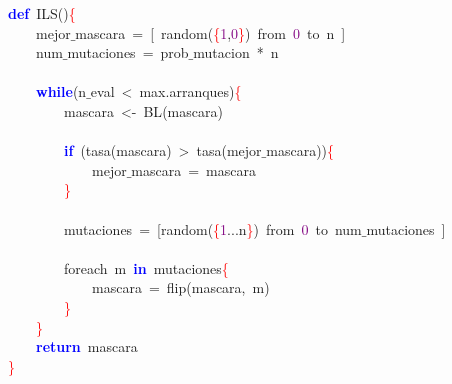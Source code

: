 \noindent
\mbox{}\textbf{\textcolor{Blue}{def}}\ ILS\textcolor{BrickRed}{()}\textcolor{Red}{\{} \\
\mbox{}\ \ \ \ mejor$\_$mascara\ \textcolor{BrickRed}{=}\ \textcolor{BrickRed}{[}\ random\textcolor{BrickRed}{(}\textcolor{Red}{\{}\textcolor{Purple}{1}\textcolor{BrickRed}{,}\textcolor{Purple}{0}\textcolor{Red}{\}}\textcolor{BrickRed}{)}\ from\ \textcolor{Purple}{0}\ to\ n\ \textcolor{BrickRed}{]} \\
\mbox{}\ \ \ \ num$\_$mutaciones\ \textcolor{BrickRed}{=}\ prob$\_$mutacion\ \textcolor{BrickRed}{*}\ n \\
\mbox{} \\
\mbox{}\ \ \ \ \textbf{\textcolor{Blue}{while}}\textcolor{BrickRed}{(}n$\_$eval\ \textcolor{BrickRed}{\textless{}}\ max\textcolor{BrickRed}{.}arranques\textcolor{BrickRed}{)}\textcolor{Red}{\{} \\
\mbox{}\ \ \ \ \ \ \ \ mascara\ \textcolor{BrickRed}{\textless{}-}\ BL\textcolor{BrickRed}{(}mascara\textcolor{BrickRed}{)} \\
\mbox{} \\
\mbox{}\ \ \ \ \ \ \ \ \textbf{\textcolor{Blue}{if}}\ \textcolor{BrickRed}{(}tasa\textcolor{BrickRed}{(}mascara\textcolor{BrickRed}{)}\ \textcolor{BrickRed}{\textgreater{}}\ tasa\textcolor{BrickRed}{(}mejor$\_$mascara\textcolor{BrickRed}{))}\textcolor{Red}{\{} \\
\mbox{}\ \ \ \ \ \ \ \ \ \ \ \ mejor$\_$mascara\ \textcolor{BrickRed}{=}\ mascara \\
\mbox{}\ \ \ \ \ \ \ \ \textcolor{Red}{\}} \\
\mbox{} \\
\mbox{}\ \ \ \ \ \ \ \ mutaciones\ \textcolor{BrickRed}{=}\ \textcolor{BrickRed}{[}random\textcolor{BrickRed}{(}\textcolor{Red}{\{}\textcolor{Purple}{1}\textcolor{BrickRed}{...}n\textcolor{Red}{\}}\textcolor{BrickRed}{)}\ from\ \textcolor{Purple}{0}\ to\ num$\_$mutaciones\ \textcolor{BrickRed}{]} \\
\mbox{} \\
\mbox{}\ \ \ \ \ \ \ \ foreach\ m\ \textbf{\textcolor{Blue}{in}}\ mutaciones\textcolor{Red}{\{} \\
\mbox{}\ \ \ \ \ \ \ \ \ \ \ \ mascara\ \textcolor{BrickRed}{=}\ flip\textcolor{BrickRed}{(}mascara\textcolor{BrickRed}{,}\ m\textcolor{BrickRed}{)} \\
\mbox{}\ \ \ \ \ \ \ \ \textcolor{Red}{\}} \\
\mbox{}\ \ \ \ \textcolor{Red}{\}} \\
\mbox{}\ \ \ \ \textbf{\textcolor{Blue}{return}}\ mascara \\
\mbox{}\textcolor{Red}{\}} \\
\mbox{}

